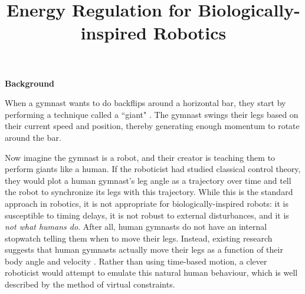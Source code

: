 \documentclass[a4paper,12pt]{article}
\begin{document}
\title{Energy Regulation for Biologically-inspired Robotics}
\author{}
\date{}
\maketitle

\vspace{-1cm} %

\begin{large}
\textbf{Background}
\end{large}

When a gymnast wants to do backflips around a horizontal bar, they start by
performing a technique called a ``giant" \cite{usagym_giant}. 
The gymnast swings their legs based on their current speed and position, thereby
generating enough momentum to rotate around the bar.

Now imagine the gymnast is a robot, and their creator is teaching them to
perform giants like a human.
If the roboticist had studied classical control theory, they would plot a human
gymnast's leg angle as a trajectory over time and tell the robot to synchronize
its legs with this trajectory.
While this is the standard approach in robotics, it is not appropriate for
biologically-inspired robots: it is susceptible to timing delays, it is not
robust to external disturbances, and it is \textit{not what humans do}.
After all, human gymnasts do not have an internal stopwatch telling them when to
move their legs.
Instead, existing research suggests that human gymnasts actually move their legs
as a function of their body angle and velocity
\cite{pendulum_length_giant_gymnastics}. 
Rather than using time-based motion, a clever roboticist would attempt to
emulate this natural human behaviour, which is well described by the method
of virtual constraints.
\end{document}
